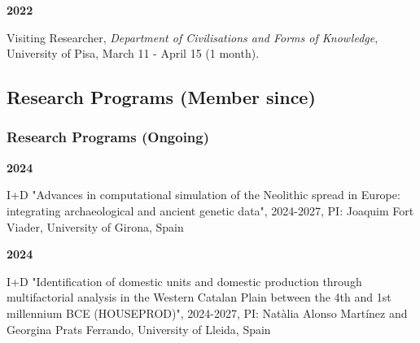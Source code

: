 \documentclass{article}
\newcommand{\fr}[1]{}       %
\newcommand{\en}[1]{#1}     %
\begin{document}
\textbf{2022}
\fr{Chercheur invité, \textit{Dipartimento di Civiltà e forme del Sapere}, Università di Pisa, 11 mars - 15 avril (1 mois).}
\en{Visiting Researcher, \textit{Department of Civilisations and Forms of Knowledge}, University of Pisa, March 11 - April 15 (1 month).}

\smallbreak

\subsection*{\fr{Programmes de recherche (Membre depuis)}\en{Research Programs (Member since)}}
\subsubsection*{\fr{En cours}\en{Research Programs (Ongoing)}}

\textbf{2024 }
\fr{I+D "Advances in computational simulation of the Neolithic spread in Europe: integrating archaeological and ancient genetic data", 2024-2027, PI: Joaquim Fort Viader, Universitat de Girona, Espagne}
\en{I+D "Advances in computational simulation of the Neolithic spread in Europe: integrating archaeological and ancient genetic data", 2024-2027, PI: Joaquim Fort Viader, University of Girona, Spain}

\textbf{2024 }
\fr{I+D "Identification of domestic units and domestic production through multifactorial analysis in the Western Catalan Plain between the 4th and 1st millennium BCE (HOUSEPROD)", 2024-2027, PI: Natàlia Alonso Martínez et Georgina Prats Ferrando, Universitat de Lleida, Spain}
\en{I+D "Identification of domestic units and domestic production through multifactorial analysis in the Western Catalan Plain between the 4th and 1st millennium BCE (HOUSEPROD)", 2024-2027, PI: Natàlia Alonso Martínez and Georgina Prats Ferrando, University of Lleida, Spain}
\end{document}
